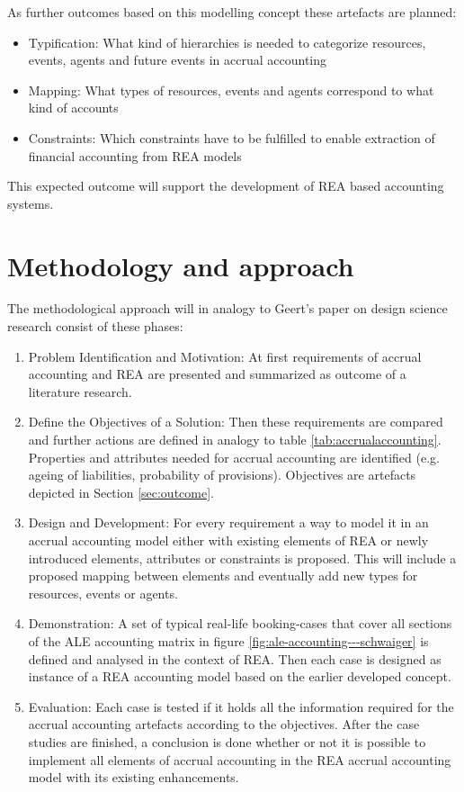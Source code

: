 As further outcomes based on this modelling concept these artefacts are planned:
\begin{itemize}
	\item Typification: What kind of hierarchies is needed to categorize resources, events, agents and future events in accrual  accounting
	\item Mapping: What types of resources, events and agents correspond to what kind of accounts
	\item Constraints: Which constraints have to be fulfilled to enable extraction of financial accounting from REA models
\end{itemize}

This expected outcome will support the development of REA based accounting systems.

\section{Methodology and approach}

The methodological approach will in analogy to Geert's paper on design science research \cite{geerts2010designsience} consist of these phases:

\begin{enumerate}
	\item Problem Identification and Motivation: At first requirements of accrual accounting and REA are presented and summarized as outcome of a literature research.
	\item Define the Objectives of a Solution:
	Then these requirements are compared and further actions are defined in analogy to table \ref{tab:accrualaccounting}. Properties and attributes needed for accrual accounting are identified (e.g. ageing of liabilities, probability of provisions).
	Objectives are artefacts depicted in Section \ref{sec:outcome}.
	\item Design and Development: For every requirement a way to model it in an accrual accounting model either with existing elements of REA or newly introduced elements, attributes or constraints is proposed.
	This will include a proposed mapping between elements and eventually add new types for resources, events or agents.
	\item Demonstration: A set of typical real-life booking-cases that cover all sections of the ALE accounting matrix in figure \ref{fig:ale-accounting---schwaiger} is defined and analysed in the context of REA.
	Then each case is designed as instance of a REA accounting model based on the earlier developed concept.
	\item Evaluation: Each case is tested if it holds all the information required for the accrual accounting artefacts according to the objectives.
	After the case studies are finished, a conclusion is done whether or not it is possible to implement all elements of accrual accounting in the REA accrual accounting model with its existing enhancements.
\end{enumerate}

